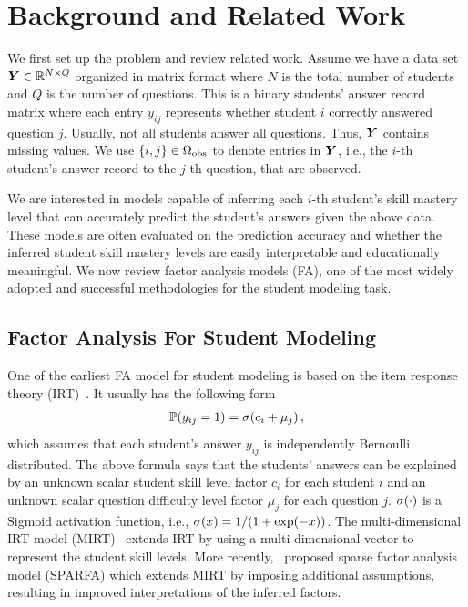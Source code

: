 \documentclass{edm_article}
\newcommand{\ml}[1]{\textcolor{orange}{\bf [LAN bandit: #1]}}
\newcommand{\jack}[1]{\textcolor{purple}{\bf [jack the ripper: #1]}}
\begin{document}
\section{Background and Related Work}
\label{sec:related-work}
We first set up the problem and review related work. Assume we have a data set ${\bm{Y}}\in\mathbb{R}^{N\times Q}$ organized in matrix format where $N$ is the total number of students and $Q$ is the number of questions. This is a binary students' answer record matrix where each entry $y_{ij}$ represents whether student $i$ correctly answered question $j$. Usually, not all students answer all questions. Thus, ${\bm{Y}}$ contains missing values. We use $\{i,j\}\in\Omega_{\rm obs}$ to denote entries in ${\bm{Y}}$, i.e., the $i$-th student's answer record to the $j$-th question, that are observed. 


We are interested in models capable of inferring each $i$-th student's skill mastery level that can accurately predict the student's answers given the above data. These models are often evaluated on the prediction accuracy and whether the inferred student skill mastery levels are easily interpretable and educationally meaningful. We now review factor analysis models (FA), one of the most widely adopted and successful methodologies for the student modeling task.

\subsection{Factor Analysis For Student Modeling}
\label{sec:fa}
One of the earliest FA model for student modeling is based on the item response theory (IRT)~\cite{irt}. It usually has the following form
\begin{align}
    \begin{split}
        \mathbb{P}(y_{ij}=1) = \sigma(c_i + \mu_j)\,,\label{eq:irt}
    \end{split}
\end{align}
which assumes that each student's answer $y_{ij}$ is independently Bernoulli distributed. The above formula says that the students' answers can be explained by an unknown scalar student skill level factor $c_i$ for each student $i$ and an unknown scalar question difficulty level factor $\mu_j$ for each question $j$. $\sigma(\cdot)$ is a Sigmoid activation function, i.e., $\sigma(x) = 1 / (1 + {\rm exp}(-x))$. The multi-dimensional IRT model (MIRT)~\cite{mirt} extends IRT by using a multi-dimensional vector to represent the student skill levels. More recently,~\cite{lan14a} proposed sparse factor analysis model (SPARFA) which extends MIRT by imposing additional assumptions, resulting in improved interpretations of the inferred factors. 
\end{document}
